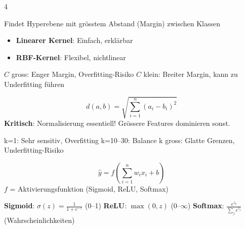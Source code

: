 \begin{landscape}
\begin{multicols*}{4}

		\begin{cheatSheetBox}[title=SVM-Grundkonzept]
			Findet Hyperebene mit grösstem Abstand (Margin) zwischen Klassen
			\begin{itemize}
				\item \textbf{Linearer Kernel}: Einfach, erklärbar
				\item \textbf{RBF-Kernel}: Flexibel, nichtlinear
			\end{itemize}
		\end{cheatSheetBox}

		\begin{cheatSheetBox}[title=Parameter C (Regularisierung)]
			$C$ gross: Enger Margin, Overfitting-Risiko
			$C$ klein: Breiter Margin, kann zu Underfitting führen
		\end{cheatSheetBox}


		\begin{cheatSheetBox}[title=Euklidische Distanz]
			\[
				d(a, b) = \sqrt{\sum_{i=1}^n (a_i - b_i)^2}
			\]
			\textbf{Kritisch}: Normalisierung essentiell! Grössere Features dominieren sonst.
		\end{cheatSheetBox}

		\begin{cheatSheetBox}[title=Hyperparameter k]
			k=1: Sehr sensitiv, Overfitting
			k=10--30: Balance
			k gross: Glatte Grenzen, Underfitting-Risiko
		\end{cheatSheetBox}

		\columnbreak


		\begin{cheatSheetBox}[title=Perceptron (Einzelneuron)]
			\[
				\hat{y} = f\left(\sum_{i=1}^{n} w_i x_i + b\right)
			\]
			$f$ = Aktivierungsfunktion (Sigmoid, ReLU, Softmax)
		\end{cheatSheetBox}

		\begin{cheatSheetBox}[title=Aktivierungsfunktionen]
			\textbf{Sigmoid}: $\sigma(z)=\frac{1}{1+e^{-z}}$ (0--1)
			\textbf{ReLU}: $\max(0,z)$ (0--$\infty$)
			\textbf{Softmax}: $\frac{e^{z_k}}{\sum_j e^{z_j}}$ (Wahrscheinlichkeiten)
		\end{cheatSheetBox}


\end{multicols*}
\end{landscape}
